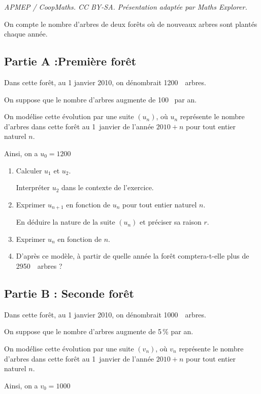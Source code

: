\documentclass[10pt]{article}
\providecommand{\np}[2][]{{#2~#1}}
\begin{document}
\noindent\textit{APMEP / CoopMaths. CC BY-SA. Présentation adaptée par Maths Explorer.}\par\medskip
On compte le nombre d'arbres de deux forêts où de nouveaux arbres sont plantés chaque année.

\subsection*{Partie A :\quad Première forêt}

Dans cette forêt, au 1 janvier 2010, on dénombrait \np{1200}~arbres.

On suppose que le nombre d'arbres augmente de \np{100} par an.

On modélise cette évolution par une suite \mbox{$(u_n)$}, où $u_n$ représente le nombre d'arbres dans cette forêt au 1~janvier de l'année \mbox{$2010+n$} pour tout entier naturel $n$.

Ainsi, on a \mbox{$u_0=\np{1200}$}
\begin{enumerate}
	\item Calculer $u_1$ et $u_2$.

	Interpréter $u_2$ dans le contexte de l'exercice.
	\item Exprimer \mbox{$u_{n+1}$} en fonction de $u_n$ pour tout entier naturel $n$.

	En déduire la nature de la suite $(u_n)$ et préciser sa raison $r$.

	\item Exprimer $u_n$ en fonction de $n$.

	\item D'après ce modèle, à partir de quelle année la forêt comptera-t-elle plus de \np{2950}~arbres ?
\end{enumerate}

\subsection*{Partie B : \quad Seconde forêt}


Dans cette forêt, au 1 janvier 2010, on dénombrait \np{1000}~arbres.

On suppose que le nombre d'arbres augmente de 5\,\% par an.

On modélise cette évolution par une suite \mbox{$(v_n)$}, où $v_n$ représente le nombre d'arbres dans cette forêt au 1~janvier de l'année \mbox{$2010+n$} pour tout entier naturel $n$.

Ainsi, on a \mbox{$v_0=\np{1000}$}
\end{document}
